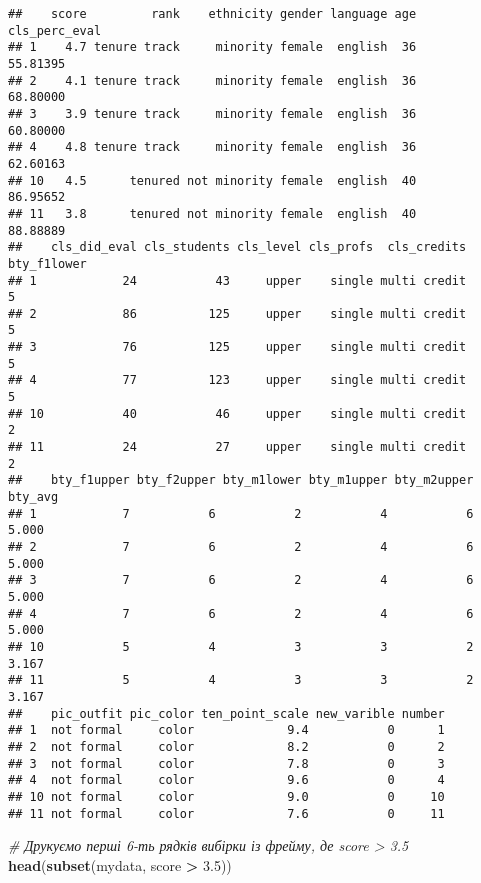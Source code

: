\documentclass[
]{article}
\newenvironment{Shaded}{\begin{snugshade}}{\end{snugshade}}
\newcommand{\CommentTok}[1]{\textcolor[rgb]{0.56,0.35,0.01}{\textit{#1}}}
\newcommand{\FloatTok}[1]{\textcolor[rgb]{0.00,0.00,0.81}{#1}}
\newcommand{\KeywordTok}[1]{\textcolor[rgb]{0.13,0.29,0.53}{\textbf{#1}}}
\newcommand{\NormalTok}[1]{#1}
\newcommand{\OperatorTok}[1]{\textcolor[rgb]{0.81,0.36,0.00}{\textbf{#1}}}
\newcommand{\StringTok}[1]{\textcolor[rgb]{0.31,0.60,0.02}{#1}}
\begin{document}
\begin{verbatim}
##    score         rank    ethnicity gender language age cls_perc_eval
## 1    4.7 tenure track     minority female  english  36      55.81395
## 2    4.1 tenure track     minority female  english  36      68.80000
## 3    3.9 tenure track     minority female  english  36      60.80000
## 4    4.8 tenure track     minority female  english  36      62.60163
## 10   4.5      tenured not minority female  english  40      86.95652
## 11   3.8      tenured not minority female  english  40      88.88889
##    cls_did_eval cls_students cls_level cls_profs  cls_credits bty_f1lower
## 1            24           43     upper    single multi credit           5
## 2            86          125     upper    single multi credit           5
## 3            76          125     upper    single multi credit           5
## 4            77          123     upper    single multi credit           5
## 10           40           46     upper    single multi credit           2
## 11           24           27     upper    single multi credit           2
##    bty_f1upper bty_f2upper bty_m1lower bty_m1upper bty_m2upper bty_avg
## 1            7           6           2           4           6   5.000
## 2            7           6           2           4           6   5.000
## 3            7           6           2           4           6   5.000
## 4            7           6           2           4           6   5.000
## 10           5           4           3           3           2   3.167
## 11           5           4           3           3           2   3.167
##    pic_outfit pic_color ten_point_scale new_varible number
## 1  not formal     color             9.4           0      1
## 2  not formal     color             8.2           0      2
## 3  not formal     color             7.8           0      3
## 4  not formal     color             9.6           0      4
## 10 not formal     color             9.0           0     10
## 11 not formal     color             7.6           0     11
\end{verbatim}

\begin{Shaded}
\begin{Highlighting}[]
\CommentTok{# Друкуємо перші 6-ть рядків вибірки із фрейму, де score > 3.5}
\KeywordTok{head}\NormalTok{(}\KeywordTok{subset}\NormalTok{(mydata, score }\OperatorTok{>}\StringTok{ }\FloatTok{3.5}\NormalTok{))}
\end{Highlighting}
\end{Shaded}
\end{document}
